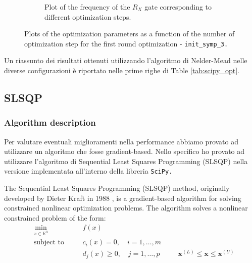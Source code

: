 \begin{figure}[htbp]
\begin{subfigure}[t]{0.45\textwidth}
        \caption{Plot of the frequency of the $R_X$ gate corresponding to different optimization steps.}
        \label{fig:20241113_200745:frequency}
    \end{subfigure}
    \caption{Plots of the optimization parameters as a function of the number of optimization step for the first round optimization - \tt{init\_symp\_3}.}
    \label{fig:20241113_200745:parameters}
\end{figure}


Un riassunto dei risultati ottenuti utilizzando l'algoritmo di Nelder-Mead nelle diverse configurazioni è riportato nelle prime righe di Table \ref{tab:scipy_opt}.
    
\subsection{SLSQP}
\subsubsection{Algorithm description}
Per valutare eventuali miglioramenti nella performance abbiamo provato ad utilizzare un algoritmo che fosse gradient-based. 
Nello specifico ho provato ad utilizzare l'algoritmo di Sequential Least Squares Programming (SLSQP) nella versione implementata all'interno della libreria \tt{SciPy}.

The Sequential Least Squares Programming (SLSQP) method, originally developed by Dieter Kraft in 1988 \cite{kraft1988slsqp}, is a gradient-based algorithm for solving constrained nonlinear optimization problems.
The algorithm solves a nonlinear constrained problem of the form:
\begin{align*}
& \min_{x \in \mathbb{R}^n} \quad && f(x) \\
& \text{subject to} \quad && c_i(x) = 0, \quad i = 1, \dots, m \\
& && d_j(x) \geq 0, \quad j = 1, \dots, p
& && \mathbf{x}^{(L)} \leq \mathbf{x} \leq \mathbf{x}^{(U)}
\end{align*}

